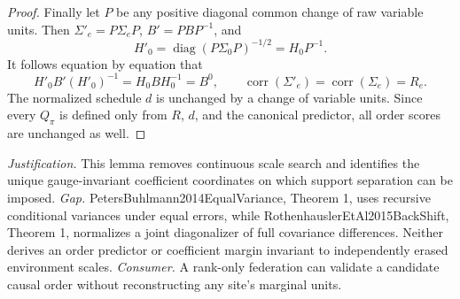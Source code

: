 \documentclass{article}
\begin{document}
\begin{proof}
Finally let \(P\) be any positive diagonal common change of raw variable units.  Then \(\Sigma'_e=P\Sigma_eP\), \(B'=PBP^{-1}\), and
\[
 H'_0=\operatorname{diag}(P\Sigma_0P)^{-1/2}=H_0P^{-1}.
\]
It follows equation by equation that
\[
 H'_0B'(H'_0)^{-1}=H_0BH_0^{-1}=B^0,
 \qquad
 \operatorname{corr}(\Sigma'_e)=\operatorname{corr}(\Sigma_e)=R_e.
\]
The normalized schedule \(d\) is unchanged by a change of variable units.  Since every \(Q_\pi\) is defined only from \(R\), \(d\), and the canonical predictor, all order scores are unchanged as well.
\end{proof}
\par\smallskip\noindent \textit{Justification.} This lemma removes continuous scale search and identifies the unique gauge-invariant coefficient coordinates on which support separation can be imposed. \textit{Gap.} PetersBuhlmann2014EqualVariance, Theorem 1, uses recursive conditional variances under equal errors, while RothenhauslerEtAl2015BackShift, Theorem 1, normalizes a joint diagonalizer of full covariance differences. Neither derives an order predictor or coefficient margin invariant to independently erased environment scales. \textit{Consumer.} A rank-only federation can validate a candidate causal order without reconstructing any site's marginal units.
\end{document}
